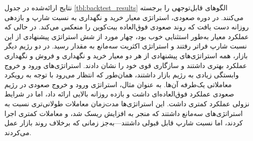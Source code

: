 نتایج ارائه‌شده در جدول \ref{tbl:backtest_results} الگوهای قابل‌توجهی را برجسته می‌کنند. در دوره صعودی، استراتژی معیار خرید و نگهداری به نسبت شارپ  و بازدهی روزانه   دست یافت که روند صعودی فوق‌العاده بیت‌کوین را منعکس می‌کند. در حالی که عملکرد معیار به‌طور استثنایی خوب بود، چهار مورد از شش استراتژی پیشنهادی از این نسبت شارپ فراتر رفتند و استراتژی اکثریت سه‌مانع به مقدار رسید. در دو رژیم دیگر بازار، همه استراتژی‌های پیشنهادی از هر دو معیار خرید و نگهداری و فروش و نگهداری عملکرد بهتری داشتند و سازگاری قوی خود را نشان دادند. استراتژی‌های ورود و خروج وابستگی زیادی به رژیم بازار داشتند، همان‌طور که انتظار می‌رود با توجه به رویکرد معاملاتی یک‌طرفه آن‌ها. به عنوان مثال، استراتژی ورود و خروج صعودی در رژیم صعودی عملکرد فوق‌العاده‌ای داشت و بازده روزانه بالایی ارائه داد، اما در شرایط نزولی عملکرد کمتری داشت. این استراتژی‌ها مدت‌زمان معاملات طولانی‌تری نسبت به استراتژی‌های سه‌مانع داشتند که منجر به افزایش ریسک شد، و معاملات کمتری اجرا کردند، اما نسبت شارپ قابل قبولی داشتند—به‌جز زمانی که برخلاف روند بازار عمل می‌کردند.


